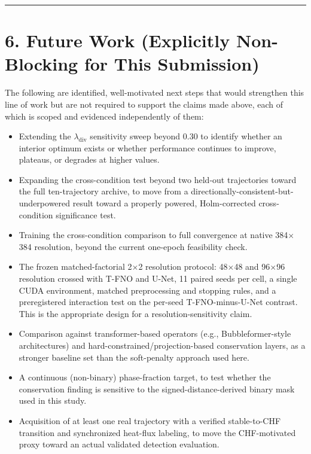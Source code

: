 \documentclass[preprint,12pt]{elsarticle}
\providecommand{\tightlist}{\setlength{\itemsep}{0pt}\setlength{\parskip}{0pt}}
\begin{document}
\begin{center}\rule{0.5\linewidth}{0.5pt}\end{center}

\section*{6. Future Work (Explicitly Non-Blocking for This
Submission)}\label{6-future-work-explicitly-non-blocking-for-this-submission}

The following are identified, well-motivated next steps that would
strengthen this line of work but are not required to support the claims
made above, each of which is scoped and evidenced independently of them:

\begin{itemize}
\tightlist
\item
  Extending the \(\lambda_{\text{div}}\) sensitivity sweep beyond 0.30
  to identify whether an interior optimum exists or whether performance
  continues to improve, plateaus, or degrades at higher values.
\item
  Expanding the cross-condition test beyond two held-out trajectories
  toward the full ten-trajectory archive, to move from a
  directionally-consistent-but-underpowered result toward a properly
  powered, Holm-corrected cross-condition significance test.
\item
  Training the cross-condition comparison to full convergence at native
  384\ensuremath{\times}384 resolution, beyond the current one-epoch feasibility check.
\item
  The frozen matched-factorial 2\ensuremath{\times}2 resolution protocol: 48\ensuremath{\times}48 and 96\ensuremath{\times}96
  resolution crossed with T-FNO and U-Net, 11 paired seeds per cell, a
  single CUDA environment, matched preprocessing and stopping rules, and
  a preregistered interaction test on the per-seed T-FNO-minus-U-Net
  contrast. This is the appropriate design for a resolution-sensitivity
  claim.
\item
  Comparison against transformer-based operators (e.g.,
  Bubbleformer-style architectures) and
  hard-constrained/projection-based conservation layers, as a stronger
  baseline set than the soft-penalty approach used here.
\item
  A continuous (non-binary) phase-fraction target, to test whether the
  conservation finding is sensitive to the signed-distance-derived
  binary mask used in this study.
\item
  Acquisition of at least one real trajectory with a verified
  stable-to-CHF transition and synchronized heat-flux labeling, to move
  the CHF-motivated proxy toward an actual validated detection
  evaluation.
\end{itemize}
\end{document}
